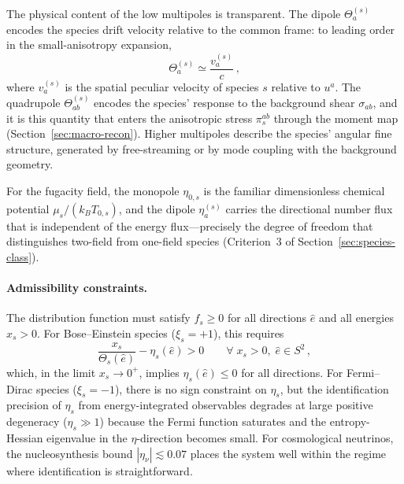 The physical content of the low multipoles is transparent.
The dipole $\Theta^{(s)}_a$ encodes the species drift
velocity relative to the common frame: to leading order in
the small-anisotropy expansion,
\begin{equation}\label{eq:dipole-drift}
\Theta^{(s)}_a
\simeq \frac{v^{(s)}_a}{c}\,,
\end{equation}
where $v^{(s)}_a$ is the spatial peculiar velocity of
species $s$ relative to $u^a$.  The quadrupole
$\Theta^{(s)}_{ab}$ encodes the species' response to
the background shear $\sigma_{ab}$, and it is this
quantity that enters the anisotropic stress
$\pi_s^{ab}$ through the moment map
(Section~\ref{sec:macro-recon}).  Higher multipoles
describe the species' angular fine structure, generated
by free-streaming or by mode coupling with the background
geometry.

For the fugacity field, the monopole $\eta_{0,s}$ is
the familiar dimensionless chemical potential
$\mu_s/(k_B T_{0,s})$, and the dipole $\eta^{(s)}_a$
carries the directional number flux that is independent
of the energy flux---precisely the degree of freedom
that distinguishes two-field from one-field species
(Criterion~3 of Section~\ref{sec:species-class}).


\paragraph{Admissibility constraints.}

The distribution function must satisfy $f_s \geq 0$ for
all directions $\hat{e}$ and all energies $x_s > 0$.
For Bose--Einstein species ($\xi_s = +1$), this requires
\begin{equation}\label{eq:BE-admissibility}
\frac{x_s}{\Theta_s(\hat{e})}
- \eta_s(\hat{e}) > 0
\qquad \forall\; x_s > 0,\;
  \hat{e} \in S^2\,,
\end{equation}
which, in the limit $x_s \to 0^+$, implies
$\eta_s(\hat{e}) \leq 0$ for all directions.  For
Fermi--Dirac species ($\xi_s = -1$), there is no sign
constraint on $\eta_s$, but the identification
precision of $\eta_s$ from energy-integrated observables
degrades at large positive degeneracy ($\eta_s \gg 1$)
because the Fermi function saturates and the
entropy-Hessian eigenvalue in the $\eta$-direction
becomes small.  For cosmological neutrinos, the
nucleosynthesis bound $|\eta_\nu| \lesssim 0.07$ places
the system well within the regime where identification
is straightforward.


